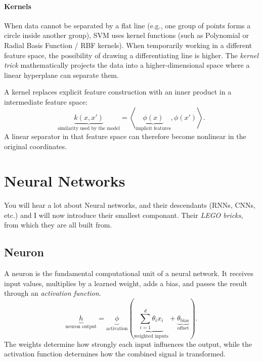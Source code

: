 \paragraph{Kernels}
When data cannot be separated by a flat line (e.g., one group of points forms a circle inside another group), SVM uses kernel functions (such as Polynomial or Radial Basis Function / RBF kernels). 
When temporarily working in a different feature space, the possibility of drawing a differentiating line is higher. 
The \textit{kernel trick} mathematically projects the data into a higher-dimensional space where a linear hyperplane can separate them.

A kernel replaces explicit feature construction with an inner product in a intermediate feature space:
\[
    \underbrace{k(x,x')}_{\text{similarity used by the model}}
    =
    \left\langle
    \underbrace{\phi(x)}_{\text{implicit features}},
    \phi(x')
    \right\rangle.
\]
A linear separator in that feature space can therefore become nonlinear in the original coordinates.



\section{Neural Networks}
\label{sec:models-neural-networks-and-nonlinear-activations}
You will hear a lot about Neural networks, and their descendants (RNNs, CNNs, etc.) and I will now introduce their smallest componant. 
Their \textit{LEGO bricks}, from which they are all built from.

\subsection{Neuron}
A neuron is the fundamental computational unit of a neural network.
It receives input values, multiplies by a learned weight, adds a bias, and passes the result through an \textit{activation function}.
\[
    \underbrace{h}_{\text{neuron output}}
    =
    \underbrace{\phi}_{\text{activation}}
    \left(
        \underbrace{\sum_{i=1}^{d} \theta_i x_i}_{\text{weighted inputs}}
        +
        \underbrace{\theta_{\text{bias}}}_{\text{offset}}
    \right).
\]
The weights determine how strongly each input influences the output, while the activation function determines how the combined signal is transformed.

